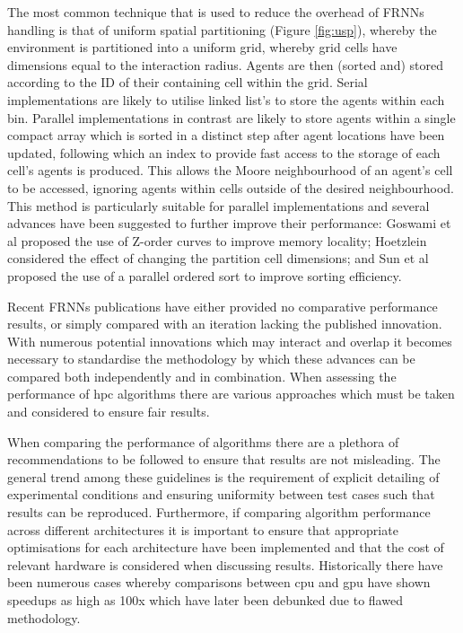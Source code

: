   The most common technique that is used to reduce the overhead of FRNNs handling is that of uniform spatial partitioning (Figure \ref{fig:usp}), whereby the environment is partitioned into a uniform grid, whereby grid cells have dimensions equal to the interaction radius. Agents are then (sorted and) stored according to the ID of their containing cell within the grid. Serial implementations are likely to utilise linked list's to store the agents within each bin. Parallel implementations in contrast are likely to store agents within a single compact array which is sorted in a distinct step after agent locations have been updated, following which an index to provide fast access to the storage of each cell’s agents is produced. This allows the Moore neighbourhood of an agent’s cell to be accessed, ignoring agents within cells outside of the desired neighbourhood. This method is particularly suitable for parallel implementations\cite{Gre10} and several advances have been suggested to further improve their performance: Goswami et al proposed the use of Z-order curves to improve memory locality\cite{GS*10}; Hoetzlein considered the effect of changing the partition cell dimensions\cite{Hoe14}; and Sun et al proposed the use of a parallel ordered sort to improve sorting efficiency\cite{HY*15}.

  Recent FRNNs publications have either provided no comparative performance results, or simply compared with an iteration lacking the published innovation\cite{GS*10,Hoe14,HY*15}. With numerous potential innovations which may interact and overlap it becomes necessary to standardise the methodology by which these advances can be compared both independently and in combination. When assessing the performance of \gls{hpc} algorithms there are various approaches which must be taken and considered to ensure fair results.
  
  When comparing the performance of algorithms there are a plethora of recommendations to be followed to ensure that results are not misleading\cite{Bai92}. The general trend among these guidelines is the requirement of explicit detailing of experimental conditions and ensuring uniformity between test cases such that results can be reproduced. Furthermore, if comparing algorithm performance across different architectures it is important to ensure that appropriate optimisations for each architecture have been implemented and that the cost of relevant hardware is considered when discussing results. Historically there have been numerous cases whereby comparisons between \gls{cpu} and \gls{gpu} have shown speedups as high as 100x which have later been debunked due to flawed methodology\cite{LK*10}.

